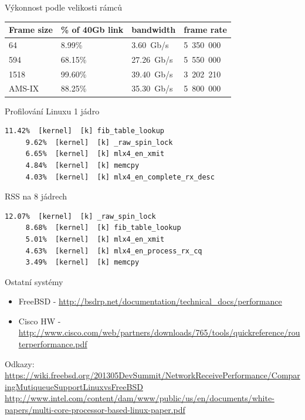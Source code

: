\documentclass{beamer}
\begin{document}
\begin{frame}{Výkonnost podle velikosti rámců}
	\begin{tabular}{ | l | l | l | l |}
	\hline
	Frame size & \% of 40Gb link & bandwidth & frame rate \\
	\hline
	64     &  8.99\% &  3.60~Gb/s & 5~350~000 \\
	594    & 68.15\% & 27.26~Gb/s & 5~550~000 \\
	1518   & 99.60\% & 39.40~Gb/s & 3~202~210 \\
	AMS-IX & 88.25\% & 35.30~Gb/s & 5~800~000 \\
	\hline
	\end{tabular}
\end{frame}

\begin{frame}[fragile]{Profilování Linuxu}
	1 jádro
	\begin{lstlisting}[basicstyle=\ttfamily]
	11.42%  [kernel]  [k] fib_table_lookup
	 9.62%  [kernel]  [k] _raw_spin_lock
	 6.65%  [kernel]  [k] mlx4_en_xmit
	 4.84%  [kernel]  [k] memcpy
	 4.03%  [kernel]  [k] mlx4_en_complete_rx_desc
	\end{lstlisting}
	
	RSS na 8 jádrech
	\begin{lstlisting}[basicstyle=\ttfamily]
	12.07%  [kernel]  [k] _raw_spin_lock
	 8.68%  [kernel]  [k] fib_table_lookup
	 5.01%  [kernel]  [k] mlx4_en_xmit
	 4.63%  [kernel]  [k] mlx4_en_process_rx_cq
	 3.49%  [kernel]  [k] memcpy
	\end{lstlisting}
\end{frame}
	
	\begin{frame}{Ostatní systémy}
	\begin{itemize}
		\item FreeBSD - \url{http://bsdrp.net/documentation/technical_docs/performance}
		\item Cisco HW - \url{http://www.cisco.com/web/partners/downloads/765/tools/quickreference/routerperformance.pdf}
	\end{itemize}
\end{frame}

\begin{frame}
	Odkazy: \\
	{\url{https://wiki.freebsd.org/201305DevSummit/NetworkReceivePerformance/ComparingMutiqueueSupportLinuxvsFreeBSD}}
	{\url{http://www.intel.com/content/dam/www/public/us/en/documents/white-papers/multi-core-processor-based-linux-paper.pdf}}
\end{frame}
\end{document}
